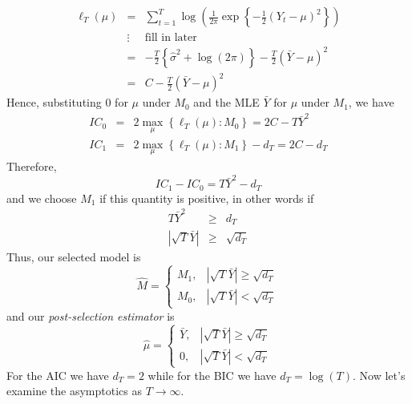 \documentclass[12pt]{article}
\theoremstyle{definition}
\begin{document}
\begin{eqnarray*}
	\ell_T(\mu)&=& \sum_{t=1}^T \log \left( \frac{1}{2\pi} \exp \left\{-\frac{1}{2}(Y_t - \mu)^2 \right\}\right)\\
	&\vdots& \boxed{\mbox{fill in later}}\\
	&=& -\frac{T}{2} \left\{ \widehat{\sigma}^2 + \log(2\pi)\right\} - \frac{T}{2}\left(\bar{Y} - \mu \right)^2\\
	&=& C - \frac{T}{2}\left(\bar{Y} - \mu \right)^2
\end{eqnarray*}
Hence, substituting $0$ for $\mu$ under $M_0$ and the MLE $\bar{Y}$ for $\mu$ under $M_1$, we have
	\begin{eqnarray*}
		IC_0 &=& 2 \max_\mu \left\{\ell_T(\mu)\colon M_0 \right\} = 2C - T\bar{Y}^2\\
		IC_1 &=&2 \max_\mu \left\{\ell_T(\mu)\colon M_1 \right\} - d_T = 2C - d_T
	\end{eqnarray*}
Therefore,
	$$IC_1 - IC_0 = T\bar{Y}^2 - d_T$$
and we choose $M_1$ if this quantity is positive, in other words if
	\begin{eqnarray*}
		T\bar{Y}^2 &\geq& d_T\\
		\left|\sqrt{T} \bar{Y} \right| &\geq& \sqrt{d_T}
	\end{eqnarray*}
Thus, our selected model is 
	$$\widehat{M} = \left\{\begin{array}
		{cc} M_1, & |\sqrt{T}\bar{Y} | \geq \sqrt{d_T} \\
		M_0, & |\sqrt{T}\bar{Y} |  < \sqrt{d_T}
	\end{array} \right.$$
and our \emph{post-selection estimator} is 
	$$\widehat{\mu}=\left\{\begin{array}
		{cc} \bar{Y}, & |\sqrt{T}\bar{Y} | \geq \sqrt{d_T} \\
		0, & |\sqrt{T}\bar{Y} | < \sqrt{d_T}
		\end{array}\right.$$
For the AIC we have $d_T = 2$ while for the BIC we have $d_T = \log(T)$. Now let's examine the asymptotics as $T \rightarrow \infty$.
\end{document}
